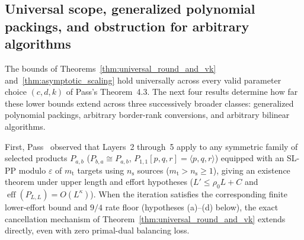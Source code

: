 \documentclass[11pt,a4paper]{article}
\theoremstyle{plain}
\theoremstyle{definition}
\theoremstyle{remark}
\DeclareMathOperator{\eff}{eff}
\begin{document}
\subsection{Universal scope, generalized polynomial packings, and obstruction for arbitrary algorithms}
\label{subsec:general_limits}

The bounds of Theorems~\ref{thm:universal_round_and_vk} and~\ref{thm:asymptotic_scaling} hold universally across every valid parameter choice $(c, d, k)$ of Pass's Theorem~4.3. The next four results determine how far these lower bounds extend across three successively broader classes: generalized polynomial packings, arbitrary border-rank conversions, and arbitrary bilinear algorithms.

First, Pass~\cite[Remark~4.5]{Pass2026} observed that Layers~2 through~5 apply to any symmetric family of selected products $P_{a,b}$ ($P_{b,a} \cong P_{a,b}$, $P_{1,1}[p, q, r] = \langle p, q, r\rangle$) equipped with an SL-PP modulo $\varepsilon$ of $m_{\mathrm{t}}$ targets using $n_{\mathrm{s}}$ sources ($m_{\mathrm{t}} > n_{\mathrm{s}} \ge 1$), giving an existence theorem under upper length and effort hypotheses ($L' \le \rho_0 L + C$ and $\eff(P_{L,L}) = O(L^\kappa)$). When the iteration satisfies the corresponding finite lower-effort bound and $9/4$ rate floor (hypotheses (a)--(d) below), the exact cancellation mechanism of Theorem~\ref{thm:universal_round_and_vk} extends directly, even with zero primal-dual balancing loss.
\end{document}

